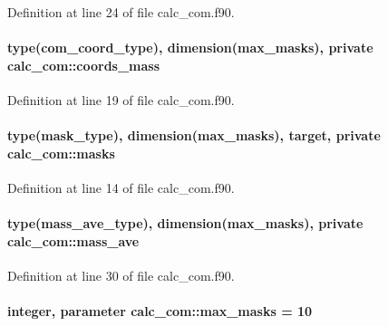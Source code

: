 Definition at line 24 of file calc\-\_\-com.\-f90.

\hypertarget{classcalc__com_a6bc271db3312791cf9abe3abd5e43c97}{
\paragraph[{coords\-\_\-mass}]{\setlength{\rightskip}{0pt plus 5cm}type({\bf com\-\_\-coord\-\_\-type}), dimension({\bf max\-\_\-masks}), private calc\-\_\-com\-::coords\-\_\-mass\hspace{0.3cm}{\ttfamily [private]}}}\label{classcalc__com_a6bc271db3312791cf9abe3abd5e43c97}


Definition at line 19 of file calc\-\_\-com.\-f90.

\hypertarget{classcalc__com_ad369fb86683077f0f092552bdcb8355d}{
\paragraph[{masks}]{\setlength{\rightskip}{0pt plus 5cm}type(mask\-\_\-type), dimension({\bf max\-\_\-masks}), target, private calc\-\_\-com\-::masks\hspace{0.3cm}{\ttfamily [private]}}}\label{classcalc__com_ad369fb86683077f0f092552bdcb8355d}


Definition at line 14 of file calc\-\_\-com.\-f90.

\hypertarget{classcalc__com_a5c973cbd7a7ab419508dc26685a6e410}{
\paragraph[{mass\-\_\-ave}]{\setlength{\rightskip}{0pt plus 5cm}type({\bf mass\-\_\-ave\-\_\-type}), dimension({\bf max\-\_\-masks}), private calc\-\_\-com\-::mass\-\_\-ave\hspace{0.3cm}{\ttfamily [private]}}}\label{classcalc__com_a5c973cbd7a7ab419508dc26685a6e410}


Definition at line 30 of file calc\-\_\-com.\-f90.

\hypertarget{classcalc__com_a5fee42e745cdac6911627aba153ac220}{
\paragraph[{max\-\_\-masks}]{\setlength{\rightskip}{0pt plus 5cm}integer, parameter calc\-\_\-com\-::max\-\_\-masks = 10}}\label{classcalc__com_a5fee42e745cdac6911627aba153ac220}


